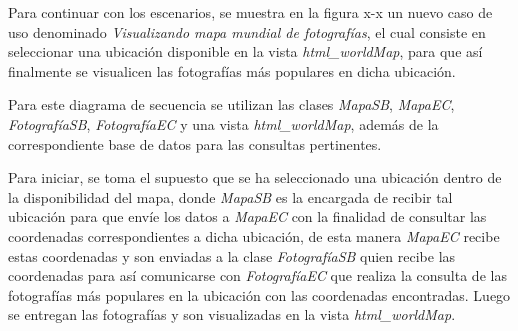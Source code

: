 \documentclass{memoria}
\begin{document}

Para continuar con los escenarios, se muestra en la figura x-x un nuevo caso de uso denominado \textsl{Visualizando mapa mundial de fotografías}, el cual consiste en seleccionar una ubicación disponible en la vista \textsl{html\_worldMap}, para que así finalmente se visualicen las fotografías más populares en dicha ubicación.

Para este diagrama de secuencia se utilizan las clases \textsl{MapaSB}, \textsl{MapaEC}, \textsl{FotografíaSB}, \textsl{FotografíaEC} y una vista \textsl{html\_worldMap}, además de la correspondiente base de datos para las consultas pertinentes.

Para iniciar, se toma el supuesto que se ha seleccionado una ubicación dentro de la disponibilidad del mapa, donde \textsl{MapaSB} es la encargada de recibir tal ubicación para que envíe los datos a \textsl{MapaEC} con la finalidad de consultar las coordenadas correspondientes a dicha ubicación, de esta manera \textsl{MapaEC} recibe estas coordenadas y son enviadas a la clase \textsl{FotografíaSB} quien recibe las coordenadas para así comunicarse con \textsl{FotografíaEC} que realiza la consulta de las fotografías más populares en la ubicación con las coordenadas encontradas. Luego se entregan las fotografías y son visualizadas en la vista \textsl{html\_worldMap}.

\newpage
{}

\end{document}
